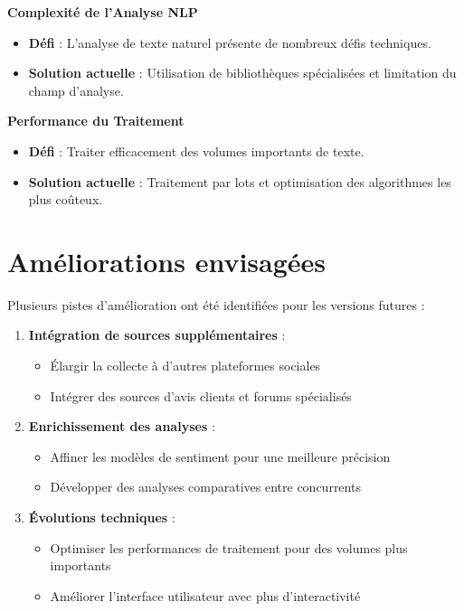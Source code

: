 \documentclass[12pt,a4paper]{report}
\begin{document}
\textbf{Complexité de l'Analyse NLP}
\begin{itemize}
    \item \textbf{Défi} : L'analyse de texte naturel présente de nombreux défis techniques.
    \item \textbf{Solution actuelle} : Utilisation de bibliothèques spécialisées et limitation du champ d'analyse.
\end{itemize}

\textbf{Performance du Traitement}
\begin{itemize}
    \item \textbf{Défi} : Traiter efficacement des volumes importants de texte.
    \item \textbf{Solution actuelle} : Traitement par lots et optimisation des algorithmes les plus coûteux.
\end{itemize}

\section{Améliorations envisagées}
Plusieurs pistes d'amélioration ont été identifiées pour les versions futures :

\begin{enumerate}
    \item \textbf{Intégration de sources supplémentaires} :
    \begin{itemize}
        \item Élargir la collecte à d'autres plateformes sociales
        \item Intégrer des sources d'avis clients et forums spécialisés
    \end{itemize}

    \item \textbf{Enrichissement des analyses} :
    \begin{itemize}
        \item Affiner les modèles de sentiment pour une meilleure précision
        \item Développer des analyses comparatives entre concurrents
    \end{itemize}

    \item \textbf{Évolutions techniques} :
    \begin{itemize}
        \item Optimiser les performances de traitement pour des volumes plus importants
        \item Améliorer l'interface utilisateur avec plus d'interactivité
    \end{itemize}
\end{enumerate}
\end{document}
